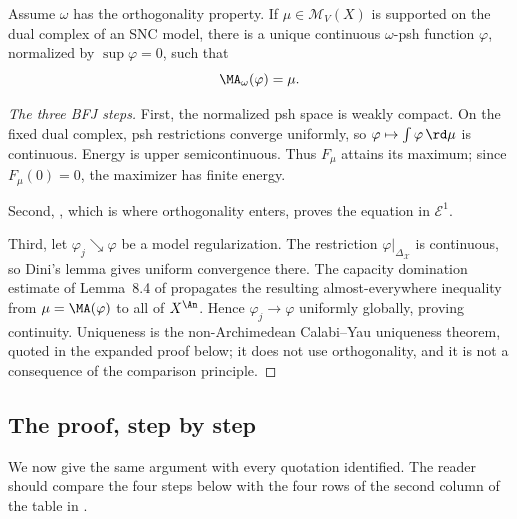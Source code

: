 \begin{theorem}
\label{thm:bfj-supported-cy}
Assume $\omega$ has the orthogonality property.  If
$\mu\in\mathcal M_V(X)$ is supported on the dual complex of an SNC model,
there is a unique continuous $\omega$-psh function $\varphi$, normalized
by $\sup\varphi=0$, such that
\begin{equation}
\label{eq:bfj-supported-cy}
                         \MA_\omega(\varphi)=\mu.
\end{equation}
\end{theorem}

\begin{proof}[The three BFJ steps]
First, the normalized psh space is weakly compact.  On the fixed dual
complex, psh restrictions converge uniformly, so
$\varphi\mapsto\int\varphi\,\rd \mu$ is continuous.  Energy is upper
semicontinuous.  Thus $F_\mu$ attains its maximum; since
$F_\mu(0)=0$, the maximizer has finite energy.

Second, , which is where
orthogonality enters, proves the equation in $\mathcal E^1$.

Third, let $\varphi_j\searrow\varphi$ be a model regularization.  The
restriction $\varphi|_{\Delta_{\mathcal X}}$ is continuous, so Dini's
lemma gives uniform convergence there.  The capacity domination estimate
of Lemma~8.4 of \cite{BFJ15} propagates the resulting almost-everywhere
inequality from $\mu=\MA(\varphi)$ to all of $X^{\An}$.  Hence
$\varphi_j\to\varphi$ uniformly globally, proving continuity.  Uniqueness
is the non-Archimedean Calabi--Yau uniqueness theorem, quoted in the
expanded proof below; it does not use orthogonality, and it is not a
consequence of the comparison principle.
\end{proof}

\subsection{The proof, step by step}
\label{sec:ch28-bfj-proof}

We now give the same argument with every quotation identified.  The reader
should compare the four steps below with the four rows of the second column
of the table in .

